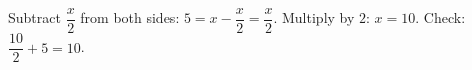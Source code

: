 Subtract $\dfrac {x}{2}$ from both sides: $5=x-\dfrac {x}{2}=\dfrac {x}{2}$. Multiply by $2$: $x=\boxed{10}$. Check: $\dfrac{10}{2}+5=10$.
